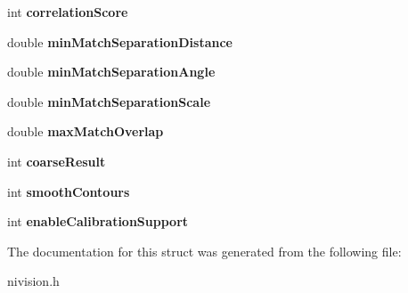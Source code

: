 \begin{DoxyCompactItemize}
\item 
\hypertarget{structMatchGeometricPatternAdvancedOptions2__struct_a51748096927414c29798d397e9c24a99}{int {\bfseries correlation\-Score}}\label{structMatchGeometricPatternAdvancedOptions2__struct_a51748096927414c29798d397e9c24a99}

\item 
\hypertarget{structMatchGeometricPatternAdvancedOptions2__struct_a1eaa3263d20dd4cda48306df32b6e9be}{double {\bfseries min\-Match\-Separation\-Distance}}\label{structMatchGeometricPatternAdvancedOptions2__struct_a1eaa3263d20dd4cda48306df32b6e9be}

\item 
\hypertarget{structMatchGeometricPatternAdvancedOptions2__struct_afe3a01a4a8f20ae7c3750cfb024eb90b}{double {\bfseries min\-Match\-Separation\-Angle}}\label{structMatchGeometricPatternAdvancedOptions2__struct_afe3a01a4a8f20ae7c3750cfb024eb90b}

\item 
\hypertarget{structMatchGeometricPatternAdvancedOptions2__struct_a77bd105824df12607689301be5c1c6d2}{double {\bfseries min\-Match\-Separation\-Scale}}\label{structMatchGeometricPatternAdvancedOptions2__struct_a77bd105824df12607689301be5c1c6d2}

\item 
\hypertarget{structMatchGeometricPatternAdvancedOptions2__struct_a34e7a44974493ab06047277d6ac0eae5}{double {\bfseries max\-Match\-Overlap}}\label{structMatchGeometricPatternAdvancedOptions2__struct_a34e7a44974493ab06047277d6ac0eae5}

\item 
\hypertarget{structMatchGeometricPatternAdvancedOptions2__struct_a1df63831000577cd87d7fbefde0f93af}{int {\bfseries coarse\-Result}}\label{structMatchGeometricPatternAdvancedOptions2__struct_a1df63831000577cd87d7fbefde0f93af}

\item 
\hypertarget{structMatchGeometricPatternAdvancedOptions2__struct_a48224da1283c950d82eb9bb75c3fcc86}{int {\bfseries smooth\-Contours}}\label{structMatchGeometricPatternAdvancedOptions2__struct_a48224da1283c950d82eb9bb75c3fcc86}

\item 
\hypertarget{structMatchGeometricPatternAdvancedOptions2__struct_a64b2739789b0363a1e84353353098763}{int {\bfseries enable\-Calibration\-Support}}\label{structMatchGeometricPatternAdvancedOptions2__struct_a64b2739789b0363a1e84353353098763}

\end{DoxyCompactItemize}


\-The documentation for this struct was generated from the following file\-:\begin{DoxyCompactItemize}
\item 
nivision.\-h\end{DoxyCompactItemize}
